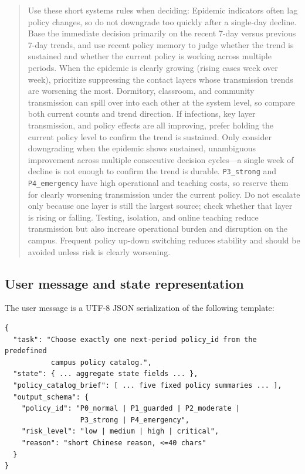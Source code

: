 \begin{quote}
Use these short systems rules when deciding: Epidemic indicators often lag
policy changes, so do not downgrade too quickly after a single-day decline.
Base the immediate decision primarily on the recent 7-day versus previous 7-day
trends, and use recent policy memory to judge whether the trend is sustained and
whether the current policy is working across multiple periods. When the epidemic
is clearly growing (rising cases week over week), prioritize suppressing the
contact layers whose transmission trends are worsening the most. Dormitory,
classroom, and community transmission can spill over into each other at the
system level, so compare both current counts and trend direction. If infections,
key layer transmission, and policy effects are all improving, prefer holding the
current policy level to confirm the trend is sustained. Only consider
downgrading when the epidemic shows sustained, unambiguous improvement across
multiple consecutive decision cycles---a single week of decline is not enough
to confirm the trend is durable. \texttt{P3\_strong} and
\texttt{P4\_emergency} have high operational and teaching costs, so reserve them
for clearly worsening transmission under the current policy. Do not escalate
only because one layer is still the largest source; check whether that layer is
rising or falling. Testing, isolation, and online teaching reduce transmission
but also increase operational burden and disruption on the campus. Frequent
policy up-down switching reduces stability and should be avoided unless risk is
clearly worsening.
\end{quote}

\subsection{User message and state representation}

The user message is a UTF-8 JSON serialization of the following template:

\begin{verbatim}
{
  "task": "Choose exactly one next-period policy_id from the predefined
           campus policy catalog.",
  "state": { ... aggregate state fields ... },
  "policy_catalog_brief": [ ... five fixed policy summaries ... ],
  "output_schema": {
    "policy_id": "P0_normal | P1_guarded | P2_moderate |
                  P3_strong | P4_emergency",
    "risk_level": "low | medium | high | critical",
    "reason": "short Chinese reason, <=40 chars"
  }
}
\end{verbatim}

